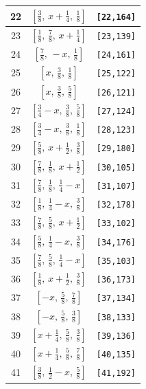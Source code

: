 \documentclass[fleqn,8pt]{jsarticle}
\begin{document}
\begin{longtable}{ccc}
22 & $\left[ \frac{3}{8},\, x + \frac{1}{4},\, \frac{1}{8} \right]$ & {\tt [22,164]} \\ \hline
23 & $\left[ \frac{1}{8},\, \frac{7}{8},\, x + \frac{1}{4} \right]$ & {\tt [23,139]} \\ \hline
24 & $\left[ \frac{7}{8},\, - x,\, \frac{1}{8} \right]$ & {\tt [24,161]} \\ \hline
25 & $\left[ x,\, \frac{3}{8},\, \frac{1}{8} \right]$ & {\tt [25,122]} \\ \hline
26 & $\left[ x,\, \frac{3}{8},\, \frac{5}{8} \right]$ & {\tt [26,121]} \\ \hline
27 & $\left[ \frac{3}{4} - x,\, \frac{3}{8},\, \frac{5}{8} \right]$ & {\tt [27,124]} \\ \hline
28 & $\left[ \frac{3}{4} - x,\, \frac{3}{8},\, \frac{1}{8} \right]$ & {\tt [28,123]} \\ \hline
29 & $\left[ \frac{5}{8},\, x + \frac{1}{2},\, \frac{3}{8} \right]$ & {\tt [29,180]} \\ \hline
30 & $\left[ \frac{7}{8},\, \frac{1}{8},\, x + \frac{1}{2} \right]$ & {\tt [30,105]} \\ \hline
31 & $\left[ \frac{7}{8},\, \frac{1}{8},\, \frac{1}{4} - x \right]$ & {\tt [31,107]} \\ \hline
32 & $\left[ \frac{1}{8},\, \frac{1}{4} - x,\, \frac{3}{8} \right]$ & {\tt [32,178]} \\ \hline
33 & $\left[ \frac{7}{8},\, \frac{5}{8},\, x + \frac{1}{2} \right]$ & {\tt [33,102]} \\ \hline
34 & $\left[ \frac{5}{8},\, \frac{1}{4} - x,\, \frac{3}{8} \right]$ & {\tt [34,176]} \\ \hline
35 & $\left[ \frac{7}{8},\, \frac{5}{8},\, \frac{1}{4} - x \right]$ & {\tt [35,103]} \\ \hline
36 & $\left[ \frac{1}{8},\, x + \frac{1}{2},\, \frac{3}{8} \right]$ & {\tt [36,173]} \\ \hline
37 & $\left[ - x,\, \frac{5}{8},\, \frac{7}{8} \right]$ & {\tt [37,134]} \\ \hline
38 & $\left[ - x,\, \frac{5}{8},\, \frac{3}{8} \right]$ & {\tt [38,133]} \\ \hline
39 & $\left[ x + \frac{1}{4},\, \frac{5}{8},\, \frac{3}{8} \right]$ & {\tt [39,136]} \\ \hline
40 & $\left[ x + \frac{1}{4},\, \frac{5}{8},\, \frac{7}{8} \right]$ & {\tt [40,135]} \\ \hline
41 & $\left[ \frac{3}{8},\, \frac{1}{2} - x,\, \frac{5}{8} \right]$ & {\tt [41,192]} \\ \hline

\end{longtable}
\end{document}
